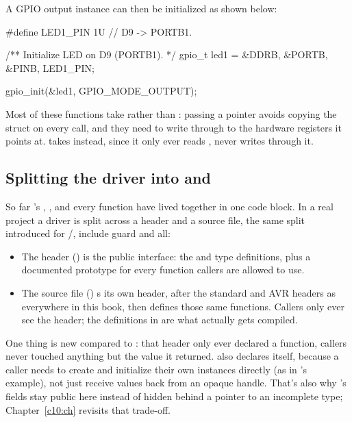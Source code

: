 \noindent A GPIO output instance can then be initialized as shown below:

\begin{ccode}
#define LED1_PIN 1U // D9 -> PORTB1.

/** Initialize LED on D9 (PORTB1). */
gpio_t led1 = {&DDRB, &PORTB, &PINB, LED1_PIN};

gpio_init(&led1, GPIO_MODE_OUTPUT);
\end{ccode}

\noindent Most of these functions take  rather than : passing a pointer
avoids copying the struct on every call, and they need to write through  to the
hardware registers it points at.  takes  instead, since it
only ever reads , never writes through it.

\subsection{Splitting the driver into  and }
\label{c9:a:3}
So far 's , , and every  function
have lived together in one code block. In a real project a driver is split across a header and a
source file, the same split  introduced for /,
include guard and all:
\begin{itemize}
  \item The header () is the public interface: the  and
     type definitions, plus a documented prototype for every function callers
    are allowed to use.
  \item The source file () s its own header, after the standard and
    AVR headers as everywhere in this book, then defines those same functions. Callers only ever
    see the header; the definitions in  are what actually gets compiled.
\end{itemize}
One thing is new compared to : that header only ever declared a function, callers
never touched anything but the value it returned.  also declares 
itself, because a caller needs to create and initialize their own  instances directly
(as in 's  example), not just receive values back from an opaque handle.
That's also why 's fields stay public here instead of hidden behind a pointer to an
incomplete type; Chapter~\ref{c10:ch} revisits that trade-off.

